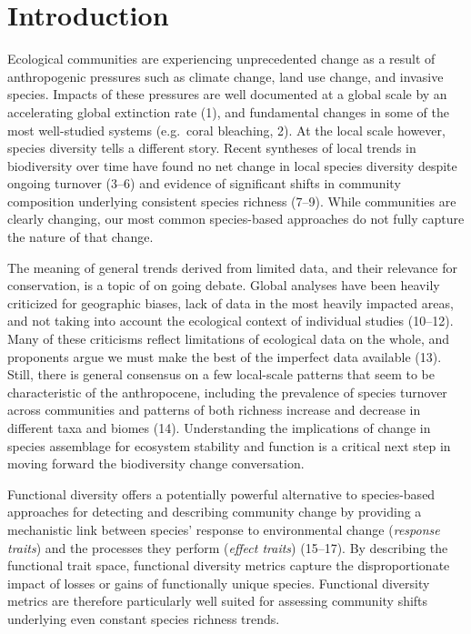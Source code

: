 \documentclass{article}
\begin{document}
\hypertarget{introduction}{%
\section{Introduction}\label{introduction}}

Ecological communities are experiencing unprecedented change as a result
of anthropogenic pressures such as climate change, land use change, and
invasive species. Impacts of these pressures are well documented at a
global scale by an accelerating global extinction rate (1), and
fundamental changes in some of the most well-studied systems (e.g.~coral
bleaching, 2). At the local scale however, species diversity tells a
different story. Recent syntheses of local trends in biodiversity over
time have found no net change in local species diversity despite ongoing
turnover (3--6) and evidence of significant shifts in community
composition underlying consistent species richness (7--9). While
communities are clearly changing, our most common species-based
approaches do not fully capture the nature of that change.

The meaning of general trends derived from limited data, and their
relevance for conservation, is a topic of on going debate. Global
analyses have been heavily criticized for geographic biases, lack of
data in the most heavily impacted areas, and not taking into account the
ecological context of individual studies (10--12). Many of these
criticisms reflect limitations of ecological data on the whole, and
proponents argue we must make the best of the imperfect data available
(13). Still, there is general consensus on a few local-scale patterns
that seem to be characteristic of the anthropocene, including the
prevalence of species turnover across communities and patterns of both
richness increase and decrease in different taxa and biomes (14).
Understanding the implications of change in species assemblage for
ecosystem stability and function is a critical next step in moving
forward the biodiversity change conversation.

Functional diversity offers a potentially powerful alternative to
species-based approaches for detecting and describing community change
by providing a mechanistic link between species' response to
environmental change (\emph{response traits}) and the processes they
perform (\emph{effect traits}) (15--17). By describing the functional
trait space, functional diversity metrics capture the disproportionate
impact of losses or gains of functionally unique species. Functional
diversity metrics are therefore particularly well suited for assessing
community shifts underlying even constant species richness trends.
\end{document}
